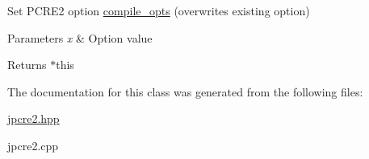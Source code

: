 Set P\+C\+R\+E2 option \hyperlink{classjpcre2_1_1Regex_a5954131e9085de63229ed5c11417df69}{compile\+\_\+opts} (overwrites existing option) 


\begin{DoxyParams}{Parameters}
{\em x} & Option value \\
\hline
\end{DoxyParams}
\begin{DoxyReturn}{Returns}
$\ast$this 
\end{DoxyReturn}


The documentation for this class was generated from the following files\+:\begin{DoxyCompactItemize}
\item 
\hyperlink{jpcre2_8hpp}{jpcre2.\+hpp}\item 
jpcre2.\+cpp\end{DoxyCompactItemize}
